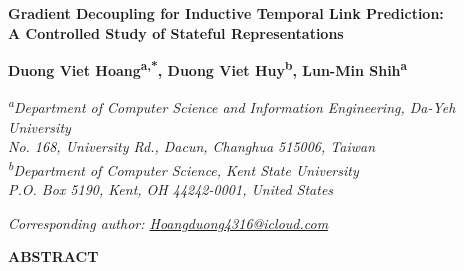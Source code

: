 \documentclass[a4paper,10pt,fleqn]{article}
\renewcommand{\normalsize}{\fontsize{9}{15.5}\selectfont}
\begin{document}
\normalsize
\setlength{\abovedisplayskip}{15.5pt}\setlength{\belowdisplayskip}{15.5pt}
\setlength{\abovedisplayshortskip}{15.5pt}\setlength{\belowdisplayshortskip}{15.5pt}
\begin{center}
{\fontsize{18}{23}\selectfont\bfseries Gradient Decoupling for Inductive Temporal Link Prediction:\\ A Controlled Study of Stateful Representations\par}
\vspace{12pt}
{\fontsize{10}{15}\selectfont\bfseries Duong Viet Hoang\textsuperscript{a,*}, Duong Viet Huy\textsuperscript{b}, Lun-Min Shih\textsuperscript{a}\par}
\vspace{6pt}
{\itshape\textsuperscript{a}Department of Computer Science and Information Engineering, Da-Yeh University\\
No. 168, University Rd., Dacun, Changhua 515006, Taiwan\\
\textsuperscript{b}Department of Computer Science, Kent State University\\
P.O. Box 5190, Kent, OH 44242-0001, United States\par}
\vspace{6pt}
{\itshape *Corresponding author: \href{mailto:Hoangduong4316@icloud.com}{Hoangduong4316@icloud.com}}
\end{center}
\vspace{18pt}
\begin{center}\fontsize{11}{16.5}\selectfont\bfseries ABSTRACT\end{center}
\end{document}
